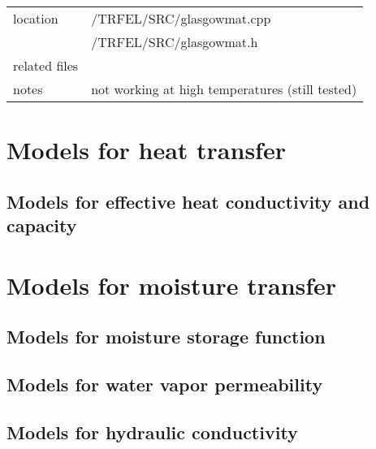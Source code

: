 \begin{itemize}
\begin{center}
\begin{tabular}{|l|l|}
\hline
location & /TRFEL/SRC/glasgowmat.cpp\\
         & /TRFEL/SRC/glasgowmat.h
\\ \hline
related files &
\\ \hline
notes &  not working at high temperatures (still tested) 
\\ \hline
\end{tabular}
\end{center}

\end{itemize}

\section{Models for heat transfer}
\subsection{Models for effective heat conductivity and capacity}



\section{Models for moisture transfer}

\subsection{Models for moisture storage function}


\subsection{Models for water vapor permeability}


\subsection{Models for hydraulic conductivity}



